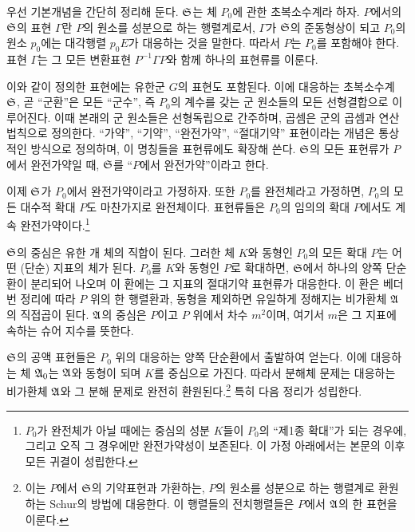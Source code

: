 우선 기본개념을 간단히 정리해 둔다. $\mathfrak S$는 체 $P_0$에 관한 초복소수계라 하자. $P$에서의 $\mathfrak S$의 표현 $\Gamma$란 $P$의 원소를 성분으로 하는 행렬계로서, $\Gamma$가 $\mathfrak S$의 준동형상이 되고 $P_0$의 원소 $p_0$에는 대각행렬 $p_0E$가 대응하는 것을 말한다. 따라서 $P$는 $P_0$를 포함해야 한다. 표현 $\Gamma$는 그 모든 변환표현 $P^{-1}\Gamma P$와 함께 하나의 표현류를 이룬다.

이와 같이 정의한 표현에는 유한군 $G$의 표현도 포함된다. 이에 대응하는 초복소수계 $\mathfrak S$, 곧 ``군환''은 모든 ``군수'', 즉 $P_0$의 계수를 갖는 군 원소들의 모든 선형결합으로 이루어진다. 이때 본래의 군 원소들은 선형독립으로 간주하며, 곱셈은 군의 곱셈과 연산법칙으로 정의한다. ``가약'', ``기약'', ``완전가약'', ``절대기약'' 표현이라는 개념은 통상적인 방식으로 정의하며, 이 명칭들을 표현류에도 확장해 쓴다. $\mathfrak S$의 모든 표현류가 $P$에서 완전가약일 때, $\mathfrak S$를 ``$P$에서 완전가약''이라고 한다.

이제 $\mathfrak S$가 $P_0$에서 완전가약이라고 가정하자. 또한 $P_0$를 완전체라고 가정하면, $P_0$의 모든 대수적 확대 $P$도 마찬가지로 완전체이다. 표현류들은 $P_0$의 임의의 확대 $P$에서도 계속 완전가약이다.\footnote{$P_0$가 완전체가 아닐 때에는 중심의 성분 $K$들이 $P_0$의 ``제1종 확대''가 되는 경우에, 그리고 오직 그 경우에만 완전가약성이 보존된다. 이 가정 아래에서는 본문의 이후 모든 귀결이 성립한다.}

$\mathfrak S$의 중심은 유한 개 체의 직합이 된다. 그러한 체 $K$와 동형인 $P_0$의 모든 확대 $P$는 어떤 (단순) 지표의 체가 된다. $P_0$를 $K$와 동형인 $P$로 확대하면, $\mathfrak S$에서 하나의 양쪽 단순환이 분리되어 나오며 이 환에는 그 지표의 절대기약 표현류가 대응한다. 이 환은 베더번 정리에 따라 $P$ 위의 한 행렬환과, 동형을 제외하면 유일하게 정해지는 비가환체 $\mathfrak A$의 직접곱이 된다. $\mathfrak A$의 중심은 $P$이고 $P$ 위에서 차수 $m^2$이며, 여기서 $m$은 그 지표에 속하는 슈어 지수를 뜻한다.

 $\mathfrak S$의 공액 표현들은 $P_0$ 위의 대응하는 양쪽 단순환에서 출발하여 얻는다. 이에 대응하는 체 $\mathfrak A_0$는 $\mathfrak A$와 동형이 되며 $K$를 중심으로 가진다. 따라서 분해체 문제는 대응하는 비가환체 $\mathfrak A$와 그 분해 문제로 완전히 환원된다.\footnote{이는 $P$에서 $\mathfrak S$의 기약표현과 가환하는, $P$의 원소를 성분으로 하는 행렬계로 환원하는 Schur의 방법에 대응한다. 이 행렬들의 전치행렬들은 $P$에서 $\mathfrak A$의 한 표현을 이룬다.} 특히 다음 정리가 성립한다.

